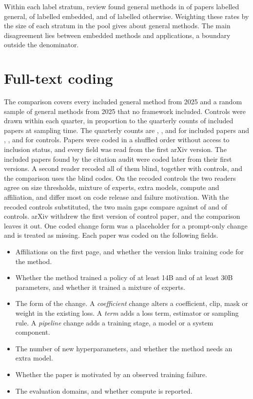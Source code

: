 \documentclass{article}
\begin{document}
Within each label stratum, review found general methods in \ReviewGenHit{} of \ReviewGenN{} papers labelled general, \ReviewEmbHit{} of \ReviewEmbN{} labelled embedded, and \ReviewOthHit{} of \ReviewOthN{} labelled otherwise. Weighting these rates by the size of each stratum in the pool gives about \ReviewEstimate{} general methods. The main disagreement lies between embedded methods and applications, a boundary outside the denominator.

\section{Full-text coding}
\label{app:fulltext}

The comparison covers every included general method from 2025 and a random sample of general methods from 2025 that no framework included. Controls were drawn within each quarter, in proportion to the quarterly counts of included papers at sampling time. The quarterly counts are \CCQOneCase{}, \CCQTwoCase{}, \CCQThreeCase{} and \CCQFourCase{} for included papers and \CCQOneCtrl{}, \CCQTwoCtrl{}, \CCQThreeCtrl{} and \CCQFourCtrl{} for controls. Papers were coded in a shuffled order without access to inclusion status, and every field was read from the first arXiv version. The included papers found by the citation audit were coded later from their first versions. A second reader recoded all of them blind, together with \CCRecodedCtrls{} controls, and the comparison uses the blind codes. On the recoded controls the two readers agree on size thresholds, mixture of experts, extra models, compute and affiliation, and differ most on code release and failure motivation. With the recoded controls substituted, the two main gaps compare against \CCRecBigThirtyCtrl{} of \CCRecBigThirtyCtrlN{} and \CCRecCoefCtrl{} of \CCRecCoefCtrlN{} controls. arXiv withdrew the first version of \CCNoVOne{} control paper, and the comparison leaves it out. One coded change form was a placeholder for a prompt-only change and is treated as missing. Each paper was coded on the following fields.
\begin{itemize}
\item Affiliations on the first page, and whether the version links training code for the method.
\item Whether the method trained a policy of at least 14B and of at least 30B parameters, and whether it trained a mixture of experts.
\item The form of the change. A \emph{coefficient} change alters a coefficient, clip, mask or weight in the existing loss. A \emph{term} adds a loss term, estimator or sampling rule. A \emph{pipeline} change adds a training stage, a model or a system component.
\item The number of new hyperparameters, and whether the method needs an extra model.
\item Whether the paper is motivated by an observed training failure.
\item The evaluation domains, and whether compute is reported.
\end{itemize}
\end{document}
